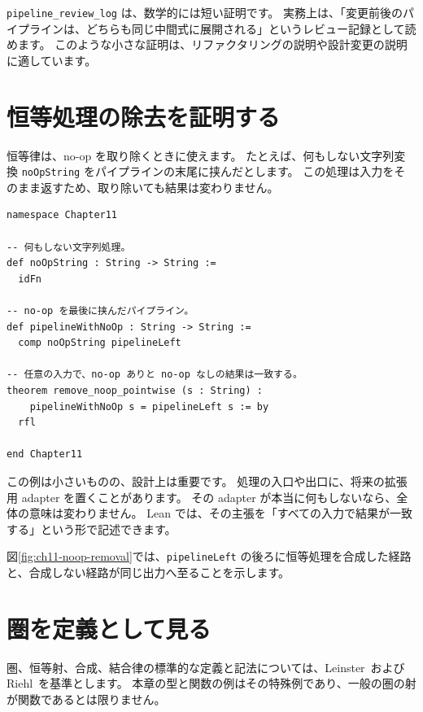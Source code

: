 \texttt{pipeline\_review\_log} は、数学的には短い証明です。
実務上は、「変更前後のパイプラインは、どちらも同じ中間式に展開される」というレビュー記録として読めます。
このような小さな証明は、リファクタリングの説明や設計変更の説明に適しています。

\section{恒等処理の除去を証明する}

恒等律は、no-op を取り除くときに使えます。
たとえば、何もしない文字列変換 \texttt{noOpString} をパイプラインの末尾に挟んだとします。
この処理は入力をそのまま返すため、取り除いても結果は変わりません。

\begin{listing}[htbp]
\begin{verbatim}
namespace Chapter11

-- 何もしない文字列処理。
def noOpString : String -> String :=
  idFn

-- no-op を最後に挟んだパイプライン。
def pipelineWithNoOp : String -> String :=
  comp noOpString pipelineLeft

-- 任意の入力で、no-op ありと no-op なしの結果は一致する。
theorem remove_noop_pointwise (s : String) :
    pipelineWithNoOp s = pipelineLeft s := by
  rfl

end Chapter11
\end{verbatim}
\caption{\texttt{remove\_noop\_pointwise}}
\label{lst:ch11_noop}
\end{listing}

この例は小さいものの、設計上は重要です。
処理の入口や出口に、将来の拡張用 adapter を置くことがあります。
その adapter が本当に何もしないなら、全体の意味は変わりません。
Lean では、その主張を「すべての入力で結果が一致する」という形で記述できます。

図\ref{fig:ch11-noop-removal}では、\texttt{pipelineLeft} の後ろに恒等処理を合成した経路と、合成しない経路が同じ出力へ至ることを示します。


\section{圏を定義として見る}

圏、恒等射、合成、結合律の標準的な定義と記法については、Leinster~\cite{leinster-basic-category-theory}およびRiehl~\cite{riehl-category-theory-in-context}を基準とします。
本章の型と関数の例はその特殊例であり、一般の圏の射が関数であるとは限りません。

